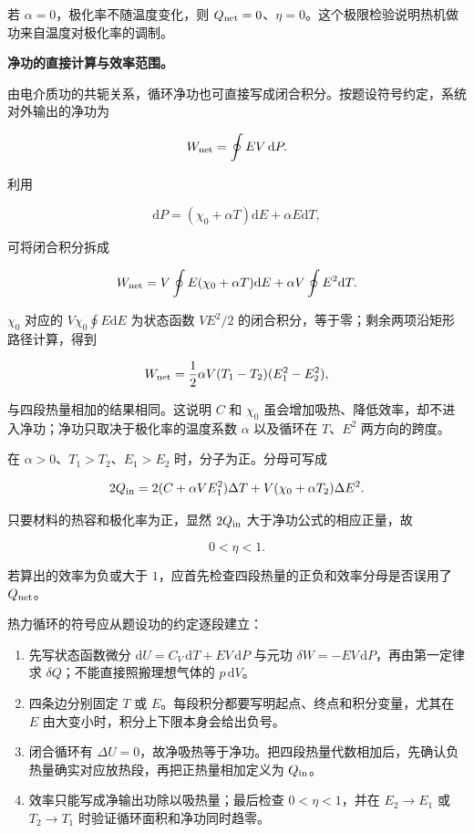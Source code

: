 \documentclass[12pt,a4paper,UTF8]{ctexart}
\newcommand{\tightlist}{\setlength{\itemsep}{0pt}\setlength{\parskip}{0pt}}
\begin{document}
若 \(\alpha=0\)，极化率不随温度变化，则
\(Q_{\rm net}=0\)、\(\eta=0\)。这个极限检验说明热机做功来自温度对极化率的调制。

\textbf{净功的直接计算与效率范围。}

由电介质功的共轭关系，循环净功也可直接写成闭合积分。按题设符号约定，系统对外输出的净功为

\[W_{\rm net}=\oint EV\,\mathrm dP.\]

利用

\[\mathrm dP=(\chi_0+\alpha T)\mathrm dE+\alpha E\mathrm dT,\]

可将闭合积分拆成

\[W_{\rm net}
=V\oint E(\chi_0+\alpha T)\mathrm dE
+\alpha V\oint E^2\mathrm dT.\]

\(\chi_0\) 对应的 \(V\chi_0\oint E\mathrm dE\) 为状态函数 \(VE^2/2\)
的闭合积分，等于零；剩余两项沿矩形路径计算，得到

\[W_{\rm net}=\frac12\alpha V(T_1-T_2)(E_1^2-E_2^2),\]

与四段热量相加的结果相同。这说明 \(C\) 和 \(\chi_0\)
虽会增加吸热、降低效率，却不进入净功；净功只取决于极化率的温度系数
\(\alpha\) 以及循环在 \(T\)、\(E^2\) 两方向的跨度。

在 \(\alpha>0\)、\(T_1>T_2\)、\(E_1>E_2\) 时，分子为正。分母可写成

\[2Q_{\rm in}
=2(C+\alpha VE_1^2)\Delta T
+V(\chi_0+\alpha T_2)\Delta E^2.\]

只要材料的热容和极化率为正，显然 \(2Q_{\rm in}\)
大于净功公式的相应正量，故

\[0<\eta<1.\]

若算出的效率为负或大于
\(1\)，应首先检查四段热量的正负和效率分母是否误用了 \(Q_{\rm net}\)。

热力循环的符号应从题设功的约定逐段建立：

\begin{enumerate}
\def\labelenumi{\arabic{enumi}.}
\tightlist
\item
  先写状态函数微分 \(\mathrm dU=C_V\,\mathrm dT+EV\,\mathrm dP\) 与元功
  \(\delta W=-EV\,\mathrm dP\)，再由第一定律求
  \(\delta Q\)；不能直接照搬理想气体的 \(p\,\mathrm dV\)。
\item
  四条边分别固定 \(T\) 或
  \(E\)。每段积分都要写明起点、终点和积分变量，尤其在 \(E\)
  由大变小时，积分上下限本身会给出负号。
\item
  闭合循环有
  \(\Delta U=0\)，故净吸热等于净功。把四段热量代数相加后，先确认负热量确实对应放热段，再把正热量相加定义为
  \(Q_{\rm in}\)。
\item
  效率只能写成净输出功除以吸热量；最后检查 \(0<\eta<1\)，并在
  \(E_2\to E_1\) 或 \(T_2\to T_1\) 时验证循环面积和净功同时趋零。
\end{enumerate}
\end{document}
